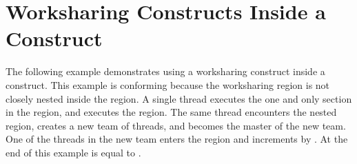 \pagebreak
\chapter{Worksharing Constructs Inside a  Construct}
\label{chap:worksharing_critical}

The following example demonstrates using a worksharing construct inside a  
construct. This example is conforming because the worksharing   
region is not closely nested inside the  region. A single thread 
executes the one and only section in the  region, and executes 
the  region. The same thread encounters the nested  
region, creates a new team of threads, and becomes the master of the new team. 
One of the threads in the new team enters the  region and increments 
 by . At the end of this example  is equal to .




